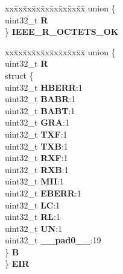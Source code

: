 \begin{DoxyCompactItemize}
\begin{tabbing}
\end{tabbing}\item 
\mbox{\label{structFEC__tag_aaf1fbdab9e7213ea1ba188e5829ab043}} 
\begin{tabbing}
xx\=xx\=xx\=xx\=xx\=xx\=xx\=xx\=xx\=\kill
union \{\\
\>uint32\_t {\bfseries R}\\
\} {\bfseries IEEE\_R\_OCTETS\_OK}\\

\end{tabbing}\item 
\mbox{\label{structFEC__tag_a92bbe0396da6f5f1c8b12624585d8a5f}} 
\begin{tabbing}
xx\=xx\=xx\=xx\=xx\=xx\=xx\=xx\=xx\=\kill
union \{\\
\>uint32\_t {\bfseries R}\\
\>struct \{\\
\>\>uint32\_t {\bfseries HBERR}:1\\
\>\>uint32\_t {\bfseries BABR}:1\\
\>\>uint32\_t {\bfseries BABT}:1\\
\>\>uint32\_t {\bfseries GRA}:1\\
\>\>uint32\_t {\bfseries TXF}:1\\
\>\>uint32\_t {\bfseries TXB}:1\\
\>\>uint32\_t {\bfseries RXF}:1\\
\>\>uint32\_t {\bfseries RXB}:1\\
\>\>uint32\_t {\bfseries MII}:1\\
\>\>uint32\_t {\bfseries EBERR}:1\\
\>\>uint32\_t {\bfseries LC}:1\\
\>\>uint32\_t {\bfseries RL}:1\\
\>\>uint32\_t {\bfseries UN}:1\\
\>\>uint32\_t {\bfseries \_\_pad0\_\_}:19\\
\>\} {\bfseries B}\\
\} {\bfseries EIR}\\


\end{tabbing}
\end{DoxyCompactItemize}
